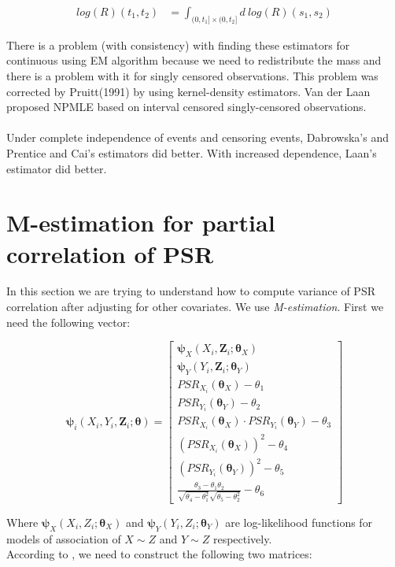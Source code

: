 \documentclass[]{article}
\begin{document}
	$$
	\begin{aligned}
		log(R)(t_1, t_2) &= \int_{(0,t_1]\times(0,t_2]} d~log(R)(s_1,s_2)
 	\end{aligned}
	$$

There is a problem (with consistency) with finding these estimators for continuous using EM algorithm because we need to redistribute the mass and there is a problem with it for singly censored observations. This problem was corrected by Pruitt(1991) by using kernel-density estimators. Van der Laan proposed NPMLE based on interval censored singly-censored observations.\\
\\
Under complete independence of events and censoring events, Dabrowska's and Prentice and Cai's estimators did better. With increased dependence, Laan's estimator did better.



\section{M-estimation for partial correlation of PSR}
In this section we are trying to understand how to compute variance of PSR correlation after adjusting for other covariates. We use \emph{M-estimation}. First we need the following vector:

\[
\pmb{\psi}_i(X_i, Y_i, \pmb{Z}_i; \pmb{\theta}) = \begin{bmatrix}
    \pmb{\psi}_X(X_i,\pmb{Z}_i; \pmb{\theta}_X) \\
    \pmb{\psi}_Y(Y_i,\pmb{Z}_i; \pmb{\theta}_Y) \\
    PSR_{X_{i}}(\pmb{\theta}_X) -\theta_1 \\
    PSR_{Y_{i}}(\pmb{\theta}_Y) -\theta_2 \\
    PSR_{X_{i}}(\pmb{\theta}_X) \cdot PSR_{Y_i}(\pmb{\theta}_Y) -\theta_3 \\
    (PSR_{X_{i}}(\pmb{\theta}_X))^2 -\theta_4 \\
    (PSR_{Y_{i}}(\pmb{\theta}_Y))^2 -\theta_5 \\
    \frac{\theta_3 - \theta_1\theta_2}{\sqrt{\theta_4 - \theta_1^2}\sqrt{\theta_5 - \theta_2^2}} - \theta_6
\end{bmatrix}
\]

Where $\pmb{\psi}_X(X_i,Z_i; \pmb{\theta}_X)$ and $\pmb{\psi}_Y(Y_i,Z_i; \pmb{\theta}_Y)$ are log-likelihood functions for models of association of $X\sim Z $ and $Y \sim Z$ respectively.\\
According to \cite{stefanski2002calculus}, we need to construct the following two matrices:
\end{document}
